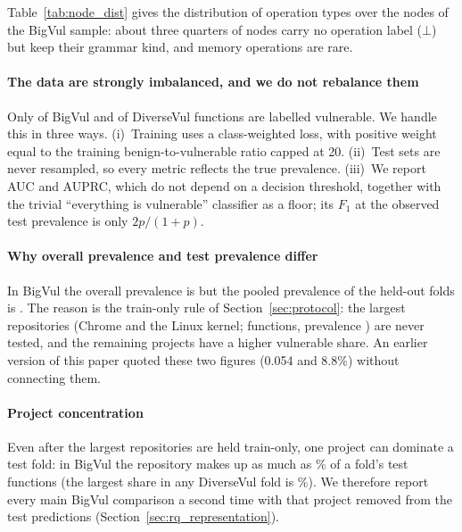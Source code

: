 

Table~\ref{tab:node_dist} gives the distribution of operation types over
the nodes of the BigVul sample: about three quarters of nodes carry no
operation label ($\bot$) but keep their grammar kind, and memory operations are
rare.



\paragraph{The data are strongly imbalanced, and we do not rebalance them}
Only \numbigvulPrev{} of BigVul and \numdiversevulPrev{} of DiverseVul
functions are labelled vulnerable. We handle this in three ways. (i)~Training
uses a class-weighted loss, with positive weight equal to the training
benign-to-vulnerable ratio capped at 20. (ii)~Test sets are never resampled, so
every metric reflects the true prevalence. (iii)~We report AUC and AUPRC, which
do not depend on a decision threshold, together with the trivial
``everything is vulnerable'' classifier as a floor; its $F_1$ at the observed
test prevalence is only $2p/(1{+}p)$.

\paragraph{Why overall prevalence and test prevalence differ} In BigVul the
overall prevalence is \numbigvulPrev{} but the pooled prevalence of the
held-out folds is \numbigvulTestPrev{}. The reason is the train-only rule of
Section~\ref{sec:protocol}: the largest repositories (Chrome and the Linux
kernel; \numbigvulTrainOnlyN{} functions, prevalence \numbigvulTrainOnlyPrev{})
are never tested, and the remaining projects have a higher vulnerable share. An
earlier version of this paper quoted these two figures (0.054 and 8.8\%) without
connecting them.

\paragraph{Project concentration} Even after the largest repositories are held
train-only, one project can dominate a test fold: in BigVul the repository
\texttt{\numbigvulTopTestProject} makes up as much as
\numbigvulTopTestShareMax\% of a fold's test functions (the largest share in any
DiverseVul fold is \numdiversevulTopTestShareMax\%). We therefore report every
main BigVul comparison a second time with that project removed from the test
predictions (Section~\ref{sec:rq_representation}).

